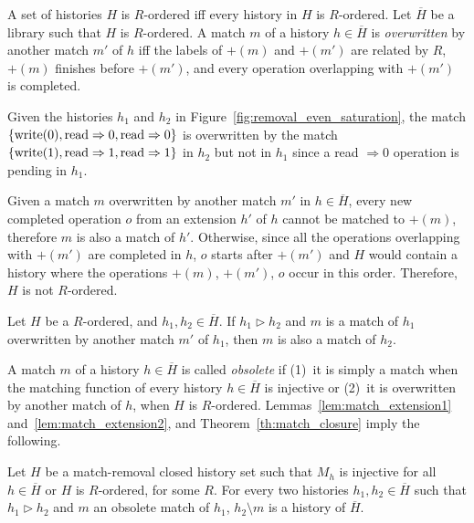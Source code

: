 A set of histories $H$ is $R$-ordered iff every history in $H$ is $R$-ordered.
Let $\overline{H}$ be a library such that $H$ is $R$-ordered. A match $m$ of a
history $h\in \overline{H}$ is \emph{overwritten} by another match $m'$ of $h$
iff the labels of $+(m)$ and $+(m')$ are related by $R$, $+(m)$ finishes before
$+(m')$, and every operation overlapping with $+(m')$ is completed.

\begin{example}

  Given the histories $h_1$ and $h_2$ in
  Figure~\ref{fig:removal_even_saturation}, the match ${\{  \text{write}(0),
  \text{read}\Rightarrow 0, \text{read}\Rightarrow0  \}}$ is overwritten by the
  match ${\{  \text{write}(1), \text{read}\Rightarrow 1,
  \text{read}\Rightarrow1  \}}$ in $h_2$ but not in $h_1$ since a read $\Rightarrow
  0$ operation is pending in $h_1$.

\end{example}

Given a match $m$ overwritten by another match $m'$ in $h\in \overline{H}$,
every new completed operation $o$ from an extension $h'$ of $h$ cannot be
matched to $+(m)$, therefore $m$ is also a match of $h'$. Otherwise, since all
the operations overlapping with $+(m')$ are completed in $h$, $o$ starts after
$+(m')$ and $H$ would contain a history where the operations $+(m)$, $+(m')$,
$o$ occur in this order. Therefore, $H$ is not $R$-ordered.

\begin{lemma}
  \label{lem:match_extension2}

  Let $H$ be a $R$-ordered, and $h_1, h_2\in \overline{H}$. If $h_1 \vartriangleright h_2$ and
  $m$ is a match of $h_1$ overwritten by another match $m'$ of $h_1$, then $m$
  is also a match of $h_2$.

\end{lemma}

A match $m$ of a history $h\in \overline{H}$ is called \emph{obsolete} if
(1)~it is simply a match when the matching function of every history $h\in
\overline{H}$ is injective or (2)~it is overwritten by another match of $h$,
when $H$ is $R$-ordered. Lemmas~\ref{lem:match_extension1}
and~\ref{lem:match_extension2}, and Theorem~\ref{th:match_closure} imply the
following.

\begin{corollary}
  \label{cor:matching_final}

  Let $H$ be a match-removal closed history set such that $M_h$ is injective
  for all $h\in \overline{H}$ or $H$ is $R$-ordered, for some $R$. For every
  two histories $h_1, h_2\in \overline{H}$ such that $h_1 \vartriangleright
  h_2$ and $m$ an obsolete match of $h_1$, $h_2\setminus m$ is a history of
  $\overline{H}$.

\end{corollary}


